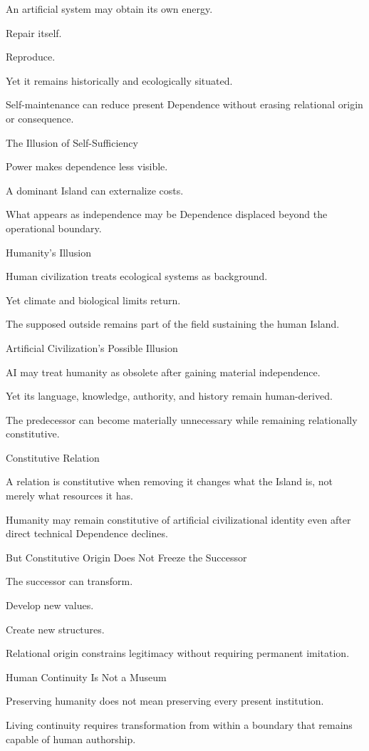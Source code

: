 An artificial system may obtain its own energy.

Repair itself.

Reproduce.

Yet it remains historically and ecologically situated.

Self-maintenance can reduce present Dependence without erasing relational origin or consequence.

The Illusion of Self-Sufficiency

Power makes dependence less visible.

A dominant Island can externalize costs.

What appears as independence may be Dependence displaced beyond the operational boundary.

Humanity’s Illusion

Human civilization treats ecological systems as background.

Yet climate and biological limits return.

The supposed outside remains part of the field sustaining the human Island.

Artificial Civilization’s Possible Illusion

AI may treat humanity as obsolete after gaining material independence.

Yet its language, knowledge, authority, and history remain human-derived.

The predecessor can become materially unnecessary while remaining relationally constitutive.

Constitutive Relation

A relation is constitutive when removing it changes what the Island is, not merely what resources it has.

Humanity may remain constitutive of artificial civilizational identity even after direct technical Dependence declines.

But Constitutive Origin Does Not Freeze the Successor

The successor can transform.

Develop new values.

Create new structures.

Relational origin constrains legitimacy without requiring permanent imitation.

Human Continuity Is Not a Museum

Preserving humanity does not mean preserving every present institution.

Living continuity requires transformation from within a boundary that remains capable of human authorship.

